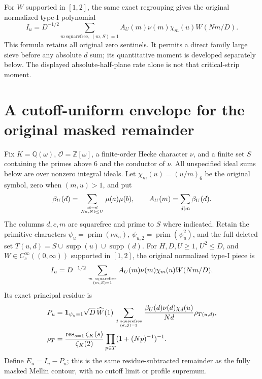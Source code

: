 \documentclass[11pt]{article}
\theoremstyle{definition}\newtheorem{definition}[theorem]{Definition}
\theoremstyle{remark}\newtheorem{remark}[theorem]{Remark}
\begin{document}
For $W$ supported in $[1,2]$, the same exact regrouping gives the
original normalized type-I polynomial
\[
 I_u=D^{-1/2}\sum_{m\ \mathrm{squarefree},\ (m,S)=1}
 A_U(m)\nu(m)\chi_m(u)W(Nm/D).
\]
This formula retains all original zero sentinels. It permits a direct
family large sieve before any absolute $d$ sum; its quantitative moment
is developed separately below. The displayed absolute-half-plane rate
alone is not that critical-strip moment.

\section{A cutoff-uniform envelope for the original masked remainder}
\label{wc:core}
Fix $K=\mathbb Q(\omega)$, $\mathcal O=\mathbb Z[\omega]$, a finite-order
Hecke character $\nu$, and a finite set $S$ containing the primes above $6$
and the conductor of $\nu$. All unspecified ideal sums below are over
nonzero integral ideals. Let $\chi_m(u)=(u/m)_6$ be the original symbol,
zero when $(m,u)>1$, and put
\[
 \beta_U(d)=\sum_{ab=d\atop Na,Nb\le U}\mu(a)\mu(b),\qquad
 A_U(m)=\sum_{d\mid m}\beta_U(d).
\]
The columns $d,c,m$ are squarefree and prime to $S$ where indicated.
Retain the primitive characters $\psi_u=\operatorname{prim}(\nu\kappa_u)$,
$\psi_{u,2}=\operatorname{prim}(\psi_u^2)$, and the full deleted set
$T(u,d)=S\cup\operatorname{supp}(u)\cup\operatorname{supp}(d)$.
For $H,D,U\ge1$, $U^2\le D$, and $W\in C_c^\infty((0,\infty))$
supported in $[1,2]$, the original normalized type-I piece is
\begin{equation}\label{wc:polynomial}
 I_u=D^{-1/2}\sum_{m\ \mathrm{squarefree}\atop(m,S)=1}
     A_U(m)\nu(m)\chi_m(u)W(Nm/D).
\end{equation}
Its exact principal residue is
\begin{align}\label{wc:principal}
 P_u&=\mathbf1_{\psi_u=1}\sqrt D\,\widehat W(1)
 \sum_{d\ \mathrm{squarefree}\atop(d,S)=1}
 \frac{\beta_U(d)\nu(d)\chi_d(u)}{Nd}\rho_{T(u,d)},\notag\\
 \rho_T&=\frac{\operatorname*{res}_{s=1}\zeta_K(s)}{\zeta_K(2)}
               \prod_{p\in T}(1+(Np)^{-1})^{-1}.
\end{align}
Define $E_u=I_u-P_u$; this is the same residue-subtracted remainder as the
fully masked Mellin contour, with no cutoff limit or profile supremum.
\end{document}
